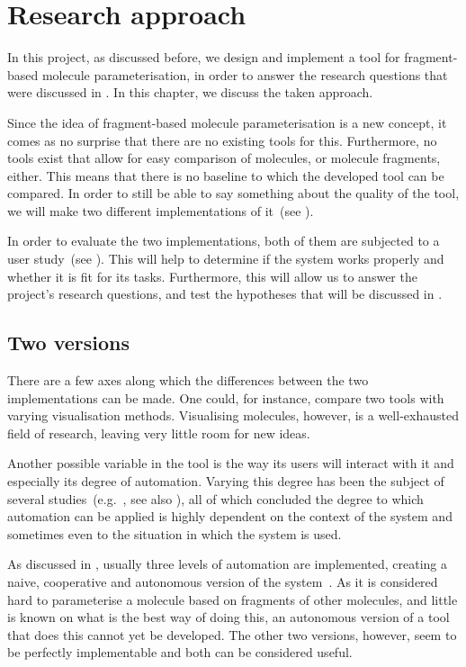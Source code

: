\chapter{Research approach}

In this project, as discussed before, we design and implement a tool for fragment-based molecule parameterisation, in order to answer the research questions that were discussed in . In this chapter, we discuss the taken approach. 

Since the idea of fragment-based molecule parameterisation is a new concept, it comes as no surprise that there are no existing tools for this. Furthermore, no tools exist that allow for easy comparison of molecules, or molecule fragments, either. This means that there is no baseline to which the developed tool can be compared. In order to still be able to say something about the quality of the tool, we will make two different implementations of it~(see ).

In order to evaluate the two implementations, both of them are subjected to a user study~(see ). This will help to determine if the system works properly and whether it is fit for its tasks. Furthermore, this will allow us to answer the project's research questions, and test the hypotheses that will be discussed in .



\section{Two versions}
There are a few axes along which the differences between the two implementations can be made. One could, for instance, compare two tools with varying visualisation methods. Visualising molecules, however, is a well-exhausted field of research, leaving very little room for new ideas.

Another possible variable in the tool is the way its users will interact with it and especially its degree of automation. Varying this degree has been the subject of several studies~(e.g.~\cite{payne2000varying, horvitz1999principles, marcus1987taking, norman1990problem}, see also ), all of which concluded the degree to which automation can be applied is highly dependent on the context of the system and sometimes even to the situation in which the system is used.

As discussed in , usually three levels of automation are implemented, creating a naive, cooperative and autonomous version of the system~\cite{payne2000varying}. As it is considered hard to parameterise a molecule based on fragments of other molecules, and little is known on what is the best way of doing this, an autonomous version of a tool that does this cannot yet be developed. The other two versions, however, seem to be perfectly implementable and both can be considered useful.

